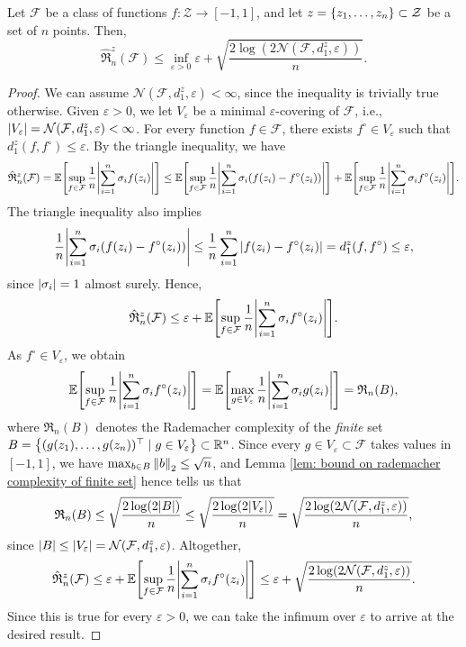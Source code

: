 \begin{theorem}
\label{thm: bound on conditional rademacher average}
Let $\mathcal{F}$ be a class of functions $f \colon \mathcal{Z} \to [-1, 1]$, and let $z = \set{z_1, \dots, z_n} \subset \mathcal{Z}$ be a set of $n$ points. Then,
\[
    \hat{\mathfrak{R}}_n^z(\mathcal{F}) \leq \inf_{\varepsilon > 0} \varepsilon + \sqrt{\frac{2 \log(2 \mathcal{N}(\mathcal{F}, d_1^z, \varepsilon))}{n}}.
\]
\end{theorem}

\begin{proof}
We can assume $\mathcal{N}(\mathcal{F}, d_1^z, \varepsilon) < \infty$, since the inequality is trivially true otherwise. Given $\varepsilon > 0$, we let $V_{\varepsilon}$ be a minimal $\varepsilon$-covering of $\mathcal{F}$, i.e., $\abs{V_{\varepsilon}} = \mathcal{N}(\mathcal{F}, d_1^z, \varepsilon) < \infty$. For every function $f \in \mathcal{F}$, there exists $f^{\circ} \in V_{\varepsilon}$ such that $d_1^z(f, f^{\circ}) \leq \varepsilon$. By the triangle inequality, we have
\[
    \hat{\mathfrak{R}}_n^z(\mathcal{F}) = \Exp\left[\sup_{f \in \mathcal{F}} \frac{1}{n} \abs{\sum_{i=1}^n \sigma_i f(z_i)}\right] \leq \Exp\left[\sup_{f \in \mathcal{F}} \frac{1}{n} \abs{\sum_{i=1}^n \sigma_i (f(z_i) - f^{\circ}(z_i))}\right] + \Exp\left[\sup_{f \in \mathcal{F}} \frac{1}{n} \abs{\sum_{i=1}^n \sigma_i f^{\circ}(z_i)}\right].
\]
The triangle inequality also implies
\[
    \frac{1}{n} \abs{\sum_{i=1}^n \sigma_i (f(z_i) - f^{\circ}(z_i))} \leq \frac{1}{n} \sum_{i=1}^n \abs{f(z_i) - f^{\circ}(z_i)} = d_1^z(f, f^{\circ}) \leq \varepsilon,
\]
since $\abs{\sigma_i} = 1$ almost surely. Hence,
\[
    \hat{\mathfrak{R}}_n^z(\mathcal{F}) \leq \varepsilon + \Exp\left[\sup_{f \in \mathcal{F}} \frac{1}{n} \abs{\sum_{i=1}^n \sigma_i f^{\circ}(z_i)}\right].
\]
As $f^{\circ} \in V_{\varepsilon}$, we obtain
\[
    \Exp\left[\sup_{f \in \mathcal{F}} \frac{1}{n} \abs{\sum_{i=1}^n \sigma_i f^{\circ}(z_i)}\right] = \Exp\left[\max_{g \in V_{\varepsilon}} \frac{1}{n} \abs{\sum_{i=1}^n \sigma_i g(z_i)}\right] = \mathfrak{R}_n(B),
\]
where $\mathfrak{R}_n(B)$ denotes the Rademacher complexity of the \emph{finite} set $B = \set{(g(z_1), \dots, g(z_n))^{\top} \with g \in V_{\varepsilon}} \subset \R^n$. Since every $g \in V_{\varepsilon} \subset \mathcal{F}$ takes values in $[-1, 1]$, we have $\max_{b \in B} \norm{b}_2 \leq \sqrt{n}$, and Lemma \ref{lem: bound on rademacher complexity of finite set} hence tells us that
\[
    \mathfrak{R}_n(B) \leq \sqrt{\frac{2 \log(2 \abs{B})}{n}} \leq \sqrt{\frac{2 \operatorname{log}(2 \abs{V_{\varepsilon}})}{n}} = \sqrt{\frac{2 \operatorname{log}(2 \mathcal{N}(\mathcal{F}, d_1^z, \varepsilon))}{n}},
\]
since $\abs{B} \leq \abs{V_{\varepsilon}} = \mathcal{N}(\mathcal{F}, d_1^z, \varepsilon)$. Altogether,
\[
    \hat{\mathfrak{R}}_n^z(\mathcal{F}) \leq \varepsilon + \Exp\left[\sup_{f \in \mathcal{F}} \frac{1}{n} \abs{\sum_{i=1}^n \sigma_i f^{\circ}(z_i)}\right] \leq \varepsilon + \sqrt{\frac{2 \operatorname{log}(2 \mathcal{N}(\mathcal{F}, d_1^z, \varepsilon))}{n}}.
\]
Since this is true for every $\varepsilon > 0$, we can take the infimum over $\varepsilon$ to arrive at the desired result.
\end{proof}

